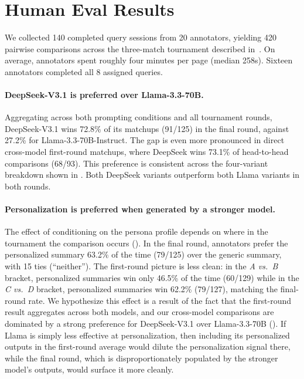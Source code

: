 \clearpage
\section{Human Eval Results \hyperref[chsevenrq2]{\chsevenrqtwo}}\label{sec:ch-7-human-eval-results}

We collected 140 completed query sessions from 20 annotators, yielding 420 pairwise comparisons across the three-match tournament described in~. On average, annotators spent roughly four minutes per page (median 258s). Sixteen annotators completed all 8 assigned queries.

\paragraph{DeepSeek-V3.1 is preferred over Llama-3.3-70B.}
Aggregating across both prompting conditions and all tournament rounds, DeepSeek-V3.1 wins 72.8\% of its matchups (91/125) in the final round, against 27.2\% for Llama-3.3-70B-Instruct. The gap is even more pronounced in direct cross-model first-round matchups, where DeepSeek wins 73.1\% of head-to-head comparisons (68/93). This preference is consistent across the four-variant breakdown shown in . Both DeepSeek variants outperform both Llama variants in both rounds.

\paragraph{Personalization is preferred when generated by a stronger model.}
The effect of conditioning on the persona profile depends on where in the tournament the comparison occurs (). In the final round, annotators prefer the personalized summary 63.2\% of the time (79/125) over the generic summary, with 15 ties (``neither''). The first-round picture is less clean: in the \emph{A vs.\ B} bracket, personalized summaries win only 46.5\% of the time (60/129) while in the \emph{C vs.\ D} bracket, personalized summaries win 62.2\% (79/127), matching the final-round rate. We hypothesize this effect is a result of the fact that the first-round result aggregates across both models, and our cross-model comparisons are dominated by a strong preference for DeepSeek-V3.1 over Llama-3.3-70B (). If Llama is simply less effective at personalization, then including its personalized outputs in the first-round average would dilute the personalization signal there, while the final round, which is disproportionately populated by the stronger model's outputs, would surface it more cleanly. 

